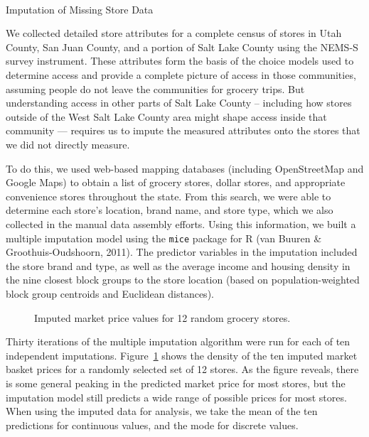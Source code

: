 \documentclass[
  letterpaper,
  number,
  review,
  3p]{elsarticle}
\makeatletter
\let\oldparagraph\paragraph
\renewcommand{\paragraph}{
    \@ifstar
      \xxxParagraphStar
      \xxxParagraphNoStar
  }
\newcommand{\xxxParagraphStar}[1]{\oldparagraph*{#1}\mbox{}}
\newcommand{\xxxParagraphNoStar}[1]{\oldparagraph{#1}\mbox{}}
\makeatother
\begin{document}
\paragraph{Imputation of Missing Store
Data}\label{imputation-of-missing-store-data}

We collected detailed store attributes for a complete census of stores
in Utah County, San Juan County, and a portion of Salt Lake County using
the NEMS-S survey instrument. These attributes form the basis of the
choice models used to determine access and provide a complete picture of
access in those communities, assuming people do not leave the
communities for grocery trips. But understanding access in other parts
of Salt Lake County -- including how stores outside of the West Salt
Lake County area might shape access inside that community --- requires
us to impute the measured attributes onto the stores that we did not
directly measure.

To do this, we used web-based mapping databases (including OpenStreetMap
and Google Maps) to obtain a list of grocery stores, dollar stores, and
appropriate convenience stores throughout the state. From this search,
we were able to determine each store's location, brand name, and store
type, which we also collected in the manual data assembly efforts. Using
this information, we built a multiple imputation model using the
\texttt{mice} package for R (van Buuren \& Groothuis-Oudshoorn, 2011).
The predictor variables in the imputation included the store brand and
type, as well as the average income and housing density in the nine
closest block groups to the store location (based on population-weighted
block group centroids and Euclidean distances).

\begin{figure}


\caption{\label{fig-marketimp}Imputed market price values for 12 random
grocery stores.}

\end{figure}%

Thirty iterations of the multiple imputation algorithm were run for each
of ten independent imputations. Figure~\ref{fig-marketimp} shows the
density of the ten imputed market basket prices for a randomly selected
set of 12 stores. As the figure reveals, there is some general peaking
in the predicted market price for most stores, but the imputation model
still predicts a wide range of possible prices for most stores. When
using the imputed data for analysis, we take the mean of the ten
predictions for continuous values, and the mode for discrete values.
\end{document}
